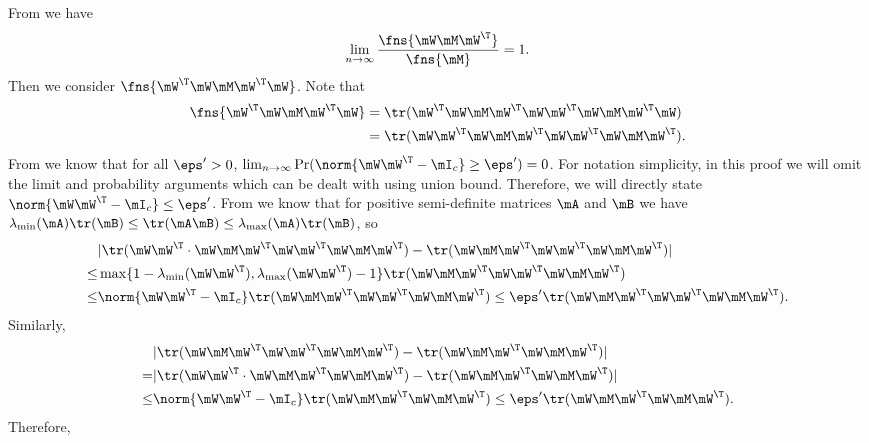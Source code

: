 From  we have 
\begin{equation}
    \lim_{n\to\infty}\frac{\fns{\mW\mM\mW^\T}}{\fns{\mM}}=1.
\end{equation}
Then we consider $\fns{\mW^\T\mW\mM \mW^\T\mW}$. Note that
\begin{equation}
\begin{split}
    \fns{\mW^\T\mW\mM\mW^\T\mW}&=\tr(\mW^\T\mW\mM\mW^\T\mW\mW^\T\mW\mM\mW^\T\mW)\\
    &=\tr(\mW\mW^\T\mW\mM\mW^\T\mW\mW^\T\mW\mM\mW^\T).
\end{split}
\end{equation}
From  we know that for all $\eps'>0$, $\lim_{n\to\infty}\Pr(\norm{\mW\mW^\T-\mI_c}\geq\eps')=0$. For notation simplicity, in this proof we will omit the limit and probability arguments which can be dealt with using union bound. Therefore, we will directly state $\norm{\mW\mW^\T-\mI_c}\leq\eps'$. From \cite{kleinman1968design} we know that for positive semi-definite matrices $\mA$ and $\mB$ we have $\lambda_{\min}(\mA)\tr(\mB)\leq \tr(\mA\mB)\leq \lambda_{\max}(\mA)\tr(\mB)$, so
\begin{equation}\begin{split}
    &|\tr(\mW\mW^\T\cdot \mW\mM \mW^\T\mW\mW^\T\mW\mM \mW^\T) - \tr(\mW\mM \mW^\T\mW\mW^\T\mW\mM \mW^\T)| \\
    \leq& \max\{1-\lambda_{\min}(\mW\mW^\T), \lambda_{\max}(\mW\mW^\T)-1\}\tr(\mW\mM \mW^\T\mW\mW^\T\mW\mM \mW^\T)\\
    \leq& \norm{\mW\mW^\T-\mI_c}\tr(\mW\mM \mW^\T\mW\mW^\T\mW\mM \mW^\T)\leq\eps'\tr(\mW\mM \mW^\T\mW\mW^\T\mW\mM \mW^\T).
\end{split}
\end{equation}
Similarly,
\begin{equation}\begin{split}
    &|\tr(\mW\mM \mW^\T\mW\mW^\T\mW\mM \mW^\T) - \tr(\mW\mM \mW^\T\mW\mM \mW^\T)|\\
    =&|\tr(\mW\mW^\T\cdot \mW\mM \mW^\T\mW\mM \mW^\T) - \tr(\mW\mM \mW^\T\mW\mM \mW^\T)|\\
    \leq&\norm{\mW\mW^\T-\mI_c}\tr(\mW\mM \mW^\T\mW\mM \mW^\T)\leq\eps'\tr(\mW\mM \mW^\T\mW\mM \mW^\T).
\end{split}\end{equation}
Therefore,
